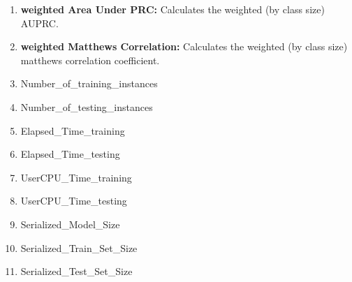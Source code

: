 \documentclass[a4paper,12pt, english]{article}
\begin{document}
\begin{enumerate}
\item \textbf{weighted Area Under PRC: }
          Calculates the weighted (by class size) AUPRC.


          
\item \textbf{weighted Matthews Correlation: }
          Calculates the weighted (by class size) matthews correlation coefficient.
          
\item Number\_of\_training\_instances

\item Number\_of\_testing\_instances          

\item Elapsed\_Time\_training

\item Elapsed\_Time\_testing

\item UserCPU\_Time\_training

\item UserCPU\_Time\_testing
    
\item Serialized\_Model\_Size

\item Serialized\_Train\_Set\_Size

\item Serialized\_Test\_Set\_Size
	    
\end{enumerate}



    
\end{document}
